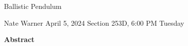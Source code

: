 \documentclass{report}
\title{\Huge{}}
\author{\huge{Nathan Warner}}
\date{\huge{}}
\begin{document}
    \begin{center}
        \begin{Huge}
            Ballistic Pendulum
        \end{Huge}
        \begin{Large}
            \bigbreak \noindent 
            Nate Warner
            \smallbreak \noindent
            April 5, 2024
            \bigbreak \noindent 
            Section 253D, 6:00 PM Tuesday 
        \end{Large}
    \end{center}
    \pagebreak 
    \tableofcontents
    \pagebreak \bigbreak \noindent 
    \begin{center}
    \textbf{Abstract}
    \end{center}
    \begin{adjustwidth}{.3in}{.3in}
        \hspace{\parindent} 
    \end{adjustwidth}

    \bigbreak \noindent 
\end{document}
